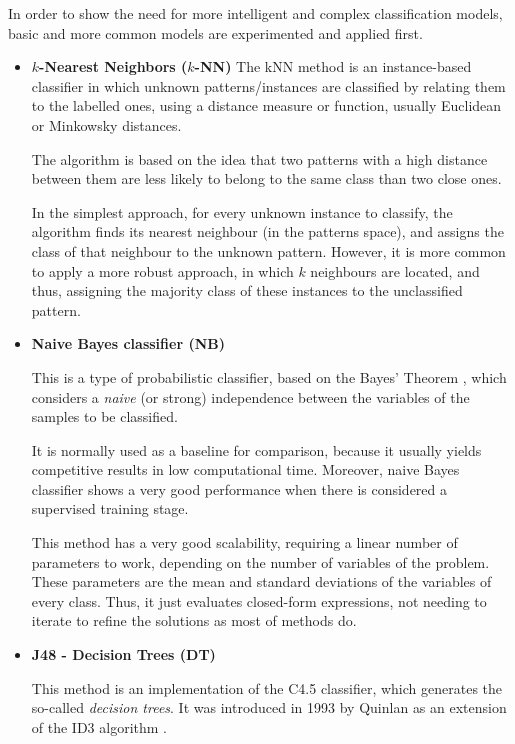 \documentclass[a4paper,10pt,twocolumn,preprint,3p]{elsarticle}
\begin{document}
In order to show the need for more intelligent and complex classification models, basic and more common models are experimented and applied first. 
\begin{itemize}

\item \textbf{$k$-Nearest Neighbors ($k$-NN)}
The kNN \cite{Aha1991,Mitchell1997} method is an instance-based classifier in 
which unknown patterns/instances are classified by relating them to the labelled ones, using a distance measure or function, usually Euclidean or Minkowsky distances.

The algorithm is based on the idea that two patterns with a high distance between them are less likely to belong to the same class than two close ones.

In the simplest approach, for every unknown instance to classify, the algorithm finds its nearest neighbour (in the patterns space), and assigns the class of that neighbour to the unknown pattern.
However, it is more common to apply a more robust approach, in which $k$ neighbours are located, and thus, assigning the majority class of these instances to the unclassified pattern.

\item \textbf{Naive Bayes classifier (NB)}

This is a type of probabilistic classifier, based on the Bayes' Theorem \cite{AI-book_Bayes}, which considers a \textit{naive} (or strong) independence between the variables of the samples to be classified.

It is normally used as a baseline for comparison, because it usually yields competitive results in low computational time. Moreover, naive Bayes classifier shows a very good performance when there is considered a supervised training stage.

This method has a very good scalability, requiring a linear number of parameters to work, depending on the number of variables of the problem. These parameters are the mean and standard deviations of the variables of every class.
Thus, it just evaluates closed-form expressions, not needing to iterate to refine the solutions as most of methods do.


\item \textbf{J48 - Decision Trees (DT)}

This method is an implementation of the C4.5 classifier, which generates the so-called \textit{decision trees}. It was introduced in 1993 by Quinlan \cite{Quinlan1993} as an extension of the ID3 algorithm \cite{Mitchell1997}. 


\end{itemize}
\end{document}
